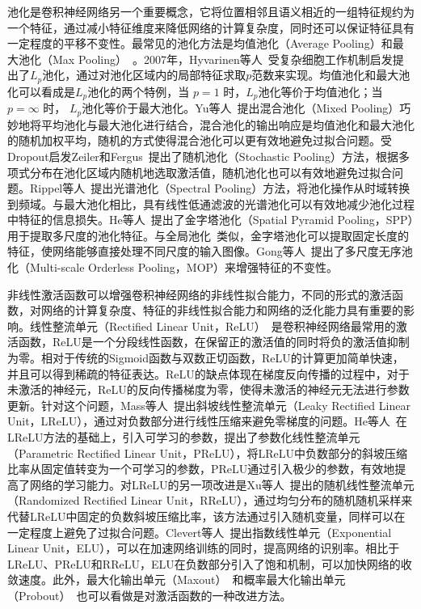 池化是卷积神经网络另一个重要概念，它将位置相邻且语义相近的一组特征规约为一个特征，通过减小特征维度来降低网络的计算复杂度，同时还可以保证特征具有一定程度的平移不变性。最常见的池化方法是均值池化（Average Pooling）和最大池化（Max Pooling）~\cite{weng1992cresceptron}。2007年，Hyvarinen等人~\cite{hyvarinen2007complex,bruna2013signal}受复杂细胞工作机制启发提出了$L_{p}$池化，通过对池化区域内的局部特征求取$p$范数来实现。均值池化和最大池化可以看成是$L_{p}$池化的两个特例，当 $p=1$ 时，$L_{p}$池化等价于均值池化；当 $p=\infty$ 时， $L_{p}$池化等价于最大池化。Yu等人~\cite{yu2014mixed}提出混合池化（Mixed Pooling）巧妙地将平均池化与最大池化进行结合，混合池化的输出响应是均值池化和最大池化的随机加权平均，随机的方式使得混合池化可以更有效地避免过拟合问题。受Dropout启发Zeiler和Fergus~\cite{zeiler2013stochastic}提出了随机池化（Stochastic Pooling）方法，根据多项式分布在池化区域内随机地选取激活值，随机池化也可以有效地避免过拟合问题。Rippel等人~\cite{rippel2015spectral}提出光谱池化（Spectral Pooling）方法，将池化操作从时域转换到频域。与最大池化相比，具有线性低通滤波的光谱池化可以有效地减少池化过程中特征的信息损失。He等人~\cite{he2014spatial}提出了金字塔池化（Spatial Pyramid Pooling，SPP）用于提取多尺度的池化特征。与全局池化~\cite{DBLP:journals/corr/LinCY13}类似，金字塔池化可以提取固定长度的特征，使网络能够直接处理不同尺度的输入图像。Gong等人~\cite{gong2014multi}提出了多尺度无序池化（Multi-scale Orderless Pooling，MOP）来增强特征的不变性。

非线性激活函数可以增强卷积神经网络的非线性拟合能力，不同的形式的激活函数，对网络的计算复杂度、特征的非线性拟合能力和网络的泛化能力具有重要的影响。线性整流单元（Rectified Linear Unit，ReLU）~\cite{nair2010rectified}是卷积神经网络最常用的激活函数，ReLU是一个分段线性函数，在保留正的激活值的同时将负的激活值抑制为零。相对于传统的Sigmoid函数与双数正切函数，ReLU的计算更加简单快速，并且可以得到稀疏的特征表达。ReLU的缺点体现在梯度反向传播的过程中，对于未激活的神经元，ReLU的反向传播梯度为零，使得未激活的神经元无法进行参数更新。针对这个问题，Mass等人~\cite{maas2013rectifier}提出斜坡线性整流单元（Leaky Rectified Linear Unit，LReLU），通过对负数部分进行线性压缩来避免零梯度的问题。He等人~\cite{he2015delving}在LReLU方法的基础上，引入可学习的参数，提出了参数化线性整流单元（Parametric Rectified Linear Unit，PReLU），将LReLU中负数部分的斜坡压缩比率从固定值转变为一个可学习的参数，PReLU通过引入极少的参数，有效地提高了网络的学习能力。对LReLU的另一项改进是Xu等人~\cite{xu2015empirical}提出的随机线性整流单元（Randomized Rectified Linear Unit，RReLU），通过均匀分布的随机随机采样来代替LReLU中固定的负数斜坡压缩比率，该方法通过引入随机变量，同样可以在一定程度上避免了过拟合问题。Clevert等人~\cite{clevert2015fast}提出指数线性单元（Exponential Linear Unit，ELU），可以在加速网络训练的同时，提高网络的识别率。相比于LReLU、PReLU和RReLU，ELU在负数部分引入了饱和机制，可以加快网络的收敛速度。此外，最大化输出单元（Maxout）~\cite{goodfellow2013maxout}和概率最大化输出单元（Probout）~\cite{springenberg2013improving}也可以看做是对激活函数的一种改进方法。

